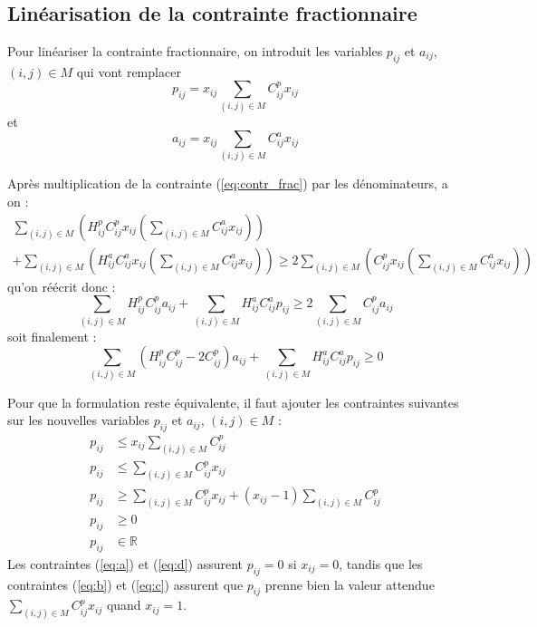 \documentclass[a4paper,11pt]{article}
\begin{document}
~\\
\subsection{Linéarisation de la contrainte fractionnaire}

Pour linéariser la contrainte fractionnaire, on introduit les variables $p_{ij}$ et $a_{ij}$, $(i,j) \in M$ qui vont remplacer
\begin{equation*}
p_{ij} = x_{ij} \sum_{(i,j)\in M} C^p_{ij} x_{ij}
\end{equation*}
et
\begin{equation*}
a_{ij} = x_{ij} \sum_{(i,j)\in M} C^a_{ij} x_{ij}
\end{equation*}


Après multiplication de la contrainte (\ref{eq:contr_frac}) par les dénominateurs, a on :
\begin{multline*}
\sum_{(i,j)\in M} \left( H^p_{ij} C^p_{ij} x_{ij} \left( \sum_{(i,j)\in M} C^a_{ij} x_{ij} \right) \right) \\
+ \sum_{(i,j)\in M} \left( H^a_{ij} C^a_{ij} x_{ij} \left( \sum_{(i,j)\in M} C^a_{ij} x_{ij} \right) \right)
\ge 2 \sum_{(i,j)\in M} \left( C^p_{ij} x_{ij} \left( \sum_{(i,j)\in M} C^a_{ij} x_{ij} \right) \right)
\end{multline*}
qu'on réécrit donc :
\begin{equation*}
\sum_{(i,j)\in M} H^p_{ij} C^p_{ij} a_{ij} + \sum_{(i,j)\in M}  H^a_{ij} C^a_{ij} p_{ij} \ge 2 \sum_{(i,j)\in M} C^p_{ij} a_{ij}
\end{equation*}
soit finalement :
\begin{equation}
\sum_{(i,j)\in M} \left( H^p_{ij} C^p_{ij} - 2 C^p_{ij} \right) a_{ij} + \sum_{(i,j)\in M}  H^a_{ij} C^a_{ij} p_{ij} \ge 0
\label{eq:contrainte}
\end{equation}


Pour que la formulation reste équivalente, il faut ajouter les contraintes suivantes sur les nouvelles variables $p_{ij}$ et $a_{ij}$, $(i,j) \in M$ :
\begin{align}
p_{ij} & \le x_{ij} \sum_{(i,j)\in M} C^p_{ij} \label{eq:a}\\
p_{ij} & \le \sum_{(i,j)\in M} C^p_{ij} x_{ij} \label{eq:b}\\
p_{ij} & \ge \sum_{(i,j)\in M} C^p_{ij} x_{ij} + (x_{ij}-1) \sum_{(i,j)\in M} C^p_{ij} \label{eq:c}\\
p_{ij} & \ge 0 \label{eq:d}\\
p_{ij} & \in \mathbb{R}
\end{align}
Les contraintes (\ref{eq:a}) et (\ref{eq:d}) assurent $p_{ij} = 0$ si $x_{ij} = 0$, tandis que les contraintes (\ref{eq:b}) et (\ref{eq:c}) assurent que $p_{ij}$ prenne bien la valeur attendue $\sum_{(i,j)\in M} C^p_{ij} x_{ij}$ quand $x_{ij} = 1$.
\end{document}
